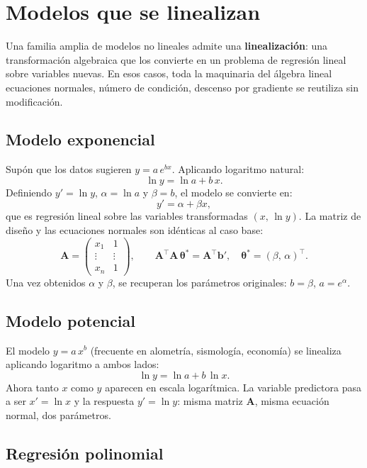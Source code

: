 \documentclass[12pt, a4paper]{article}
\newcommand{\T}{{\top}}
\newcommand{\btheta}{\boldsymbol{\theta}}
\begin{document}
\section{Modelos que se linealizan}

Una familia amplia de modelos no lineales admite una
\textbf{linealización}: una transformación algebraica que los convierte
en un problema de regresión lineal sobre variables nuevas.
En esos casos, toda la maquinaria del álgebra lineal\textemdash
ecuaciones normales, número de condición, descenso por gradiente\textemdash
se reutiliza sin modificación.

\subsection{Modelo exponencial}

Supón que los datos sugieren $y = a\,e^{bx}$. Aplicando logaritmo natural:
\[
    \ln y = \ln a + b\,x.
\]
Definiendo $y' = \ln y$, $\alpha = \ln a$ y $\beta = b$, el modelo se
convierte en:
\[
    y' = \alpha + \beta x,
\]
que es regresión lineal sobre las variables transformadas $(x,\, \ln y)$.
La matriz de diseño y las ecuaciones normales son idénticas al caso base:
\[
    \mathbf{A} = \begin{pmatrix} x_1 & 1 \\ \vdots & \vdots \\ x_n & 1 \end{pmatrix},
    \qquad
    \mathbf{A}^\T\mathbf{A}\,\btheta^* = \mathbf{A}^\T\mathbf{b}',
    \quad \btheta^* = (\beta,\, \alpha)^\T.
\]
Una vez obtenidos $\alpha$ y $\beta$, se recuperan los parámetros
originales: $b = \beta$, $a = e^{\alpha}$.

\subsection{Modelo potencial}

El modelo $y = a\,x^b$ (frecuente en alometría, sismología, economía)
se linealiza aplicando logaritmo a ambos lados:
\[
    \ln y = \ln a + b\,\ln x.
\]
Ahora tanto $x$ como $y$ aparecen en escala logarítmica. La variable
predictora pasa a ser $x' = \ln x$ y la respuesta $y' = \ln y$:
misma matriz $\mathbf{A}$, misma ecuación normal, dos parámetros.

\subsection{Regresión polinomial}
\end{document}
